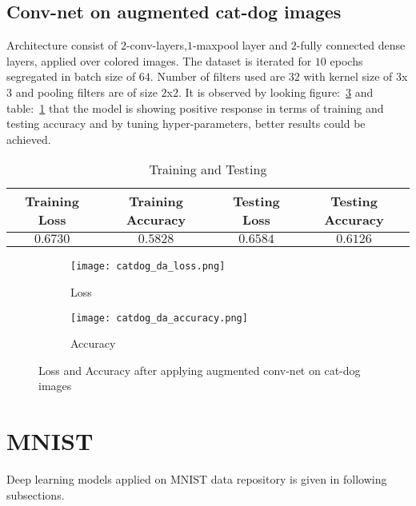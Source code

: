 \documentclass[12pt,a4paper,titlepage]{report}
\begin{document}
\subsection{Conv-net on augmented cat-dog images}
Architecture consist of $2$-conv-layers,$1$-maxpool layer and $2$-fully connected dense layers, applied over colored images. The dataset is iterated for $10$ epochs segregated in batch size of $64$. Number of filters used are $32$ with kernel size of $3$x$3$ and pooling filters are of size $2$x$2$. It is observed by looking figure:~\ref{fig: Image9} and table:~\ref{tab: Table-15} that the model is showing positive response in terms of training and testing accuracy and by tuning hyper-parameters, better results could be achieved.
\vspace{20pt}
\begin{table}[H]
\centering
\caption{Training and Testing}
\label{tab: Table-15}
\begin{tabular}{c c c c}
\hline
\textbf{Training Loss} & \textbf{Training Accuracy} & \textbf{Testing Loss} & \textbf{Testing Accuracy}\\
\hline
$0.6730$ & $0.5828$ & $0.6584$ & $0.6126$\\
\hline
\end{tabular}
\end{table}

\begin{figure}[H]
\centering
\begin{subfigure}[h]{0.45\linewidth}
\texttt{[image: catdog\_da\_loss.png]}
\caption{Loss}
\label{fig:a}
\end{subfigure}
\quad
\begin{subfigure}[h]{0.45\linewidth}
\texttt{[image: catdog\_da\_accuracy.png]}
\caption{Accuracy}
\label{fig:b}
\end{subfigure}
\caption{Loss and Accuracy after applying augmented conv-net on cat-dog images}
\label{fig: Image9}
\end{figure}

\section{MNIST}
Deep learning models applied on MNIST data repository is given in following subsections.
\end{document}
